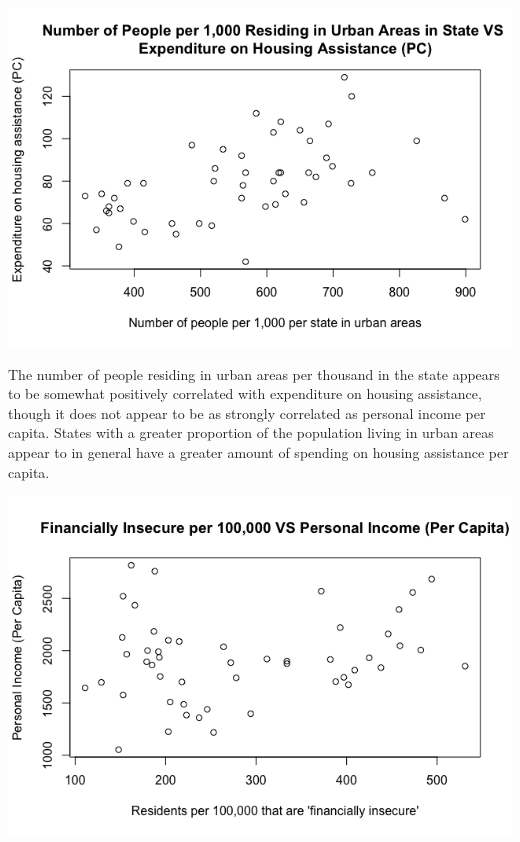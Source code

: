 \documentclass[12pt,letterpaper]{article}
\begin{document}


\newpage

\includegraphics[width=150mm]{Rplot X3 against Y}

\noindent
The number of people residing in urban areas per thousand in the state appears to be somewhat positively correlated with expenditure on housing assistance, though it does not appear to be as strongly correlated as personal income per capita. 
States with a greater proportion of the population living in urban areas appear to in general have a greater amount of spending on housing assistance per capita.
\\\vspace{.5cm}



\newpage

\includegraphics[width=150mm]{Rplot X2 against X1}
\end{document}
